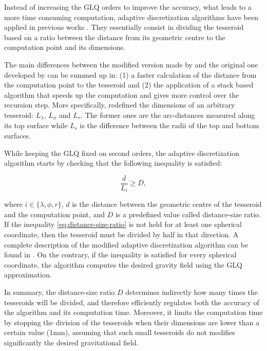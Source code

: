 \documentclass[extra]{gji}
\begin{document}
Instead of increasing the GLQ orders to improve the accuracy, what leads to a more time consuming computation, adaptive discretization algorithms have been applied in previous works \citep{Li2011, Uieda2016}.
They essentially consist in dividing the tesseroid based on a ratio between the distance from its geometric centre to the computation point and its dimensions.

The main differences between the modified version made by \citet{Uieda2016} and the original one developed by \citet{Li2011} can be summed up in:
(1) a faster calculation of the distance from the computation point to the tesseroid and 
(2) the application of a stack based algorithm that speeds up the computation and gives more control over the recursion step.
More specifically, \citet{Uieda2016} redefined the dimensions of an arbitrary tesseroid: $L_\lambda$, $L_\phi$ and $L_r$. The former ones are the arc-distances measured along its top surface while $L_r$ is the difference between the radii of the top and bottom surfaces.

While keeping the GLQ fixed on second orders, the adaptive discretization algorithm starts by checking that the following inequality is satisfied:

\begin{equation}
    \frac{d}{L_i} \geq D,
\label{eq:distance-size-ratio}
\end{equation}

\noindent where $i \in \{\lambda, \phi, r\}$, $d$ is the distance between the geometric centre of the tesseroid and the computation point, and $D$ is a predefined value called distance-size ratio.
If the inequality \ref{eq:distance-size-ratio} is not held for at least one spherical coordinate, then the tesseroid must be divided by half in that direction.
A complete description of the modified adaptive discretization algorithm can be found in \citet{Uieda2016}.
On the contrary, if the inequality is satisfied for every spherical coordinate, the algorithm computes the desired gravity field using the GLQ approximation.

In summary, the distance-size ratio $D$ determines indirectly how many times the tesseroids will be divided, and therefore efficiently regulates both the accuracy of the algorithm and its computation time.
Moreover, it limits the computation time by stopping the division of the tesseroids when their dimensions are lower than a certain value (1mm), assuming that such small tesseroids do not modifies significantly the desired gravitational field.
\end{document}
